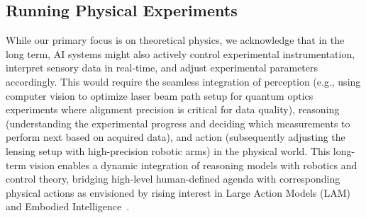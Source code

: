 \subsection{Running Physical Experiments}
\label{sec:future:inter_ctrl_exp}
While our primary focus is on theoretical physics, we acknowledge that in the long term, AI systems might also actively control experimental instrumentation, interpret sensory data in real-time, and adjust experimental parameters accordingly. This would require the seamless integration of perception (e.g., using computer vision to optimize laser beam path setup for quantum optics experiments where alignment precision is critical for data quality), reasoning (understanding the experimental progress and deciding which measurements to perform next based on acquired data), and action (subsequently adjusting the lensing setup with high-precision robotic arms) in the physical world. This long-term vision enables a dynamic integration of reasoning models with robotics and control theory, bridging high-level human-defined agenda with corresponding physical actions as envisioned by rising interest in Large Action Models (LAM)~\cite{Wang2025Large} and Embodied Intelligence~\cite{Liu2025Embodied}.